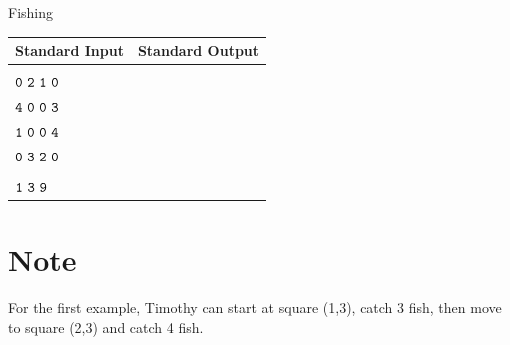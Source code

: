 \documentclass{xcpc}
\begin{document}
\begin{problem}{Fishing}
	\begin{table}[h]
		\begin{tabular}{|l|l|}
			\hline
			\textbf{Standard Input} & \textbf{Standard Output} \\ \hline
			\makecell[l]{$\tt{4\ 4}$\\$\tt{0\ 2\ 1\ 0}$\\$\tt{4\ 0\ 0\ 3}$\\$\tt{1\ 0\ 0\ 4}$\\$\tt{0\ 3\ 2\ 0}$} & \makecell[l]{$\tt{7}$} \\ \hline
			\makecell[l]{$\tt{1\ 3}$\\$\tt{1\ 3\ 9}$} & \makecell[l]{$\tt{13}$} \\ \hline
		\end{tabular}
	\end{table}
	
	\section*{Note}
	
	For the first example, Timothy can start at square (1,3), catch 3 fish, then move to square (2,3) and catch 4 fish.
	\end{problem}
\end{document}
